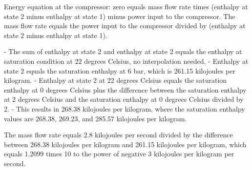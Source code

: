 Energy equation at the compressor: zero equals mass flow rate times (enthalpy at state 2 minus enthalpy at state 1) minus power input to the compressor. The mass flow rate equals the power input to the compressor divided by (enthalpy at state 2 minus enthalpy at state 1).

- The sum of enthalpy at state 2 and enthalpy at state 2 equals the enthalpy at saturation condition at 22 degrees Celsius, no interpolation needed.
- Enthalpy at state 2 equals the saturation enthalpy at 6 bar, which is 261.15 kilojoules per kilogram.
- Enthalpy at state 2 at 22 degrees Celsius equals the saturation enthalpy at 0 degrees Celsius plus the difference between the saturation enthalpy at 2 degrees Celsius and the saturation enthalpy at 0 degrees Celsius divided by 2.
- This results in 268.38 kilojoules per kilogram, where the saturation enthalpy values are 268.38, 269.23, and 285.57 kilojoules per kilogram.

The mass flow rate equals 2.8 kilojoules per second divided by the difference between 268.38 kilojoules per kilogram and 261.15 kilojoules per kilogram, which equals 1.2099 times 10 to the power of negative 3 kilojoules per kilogram per second.